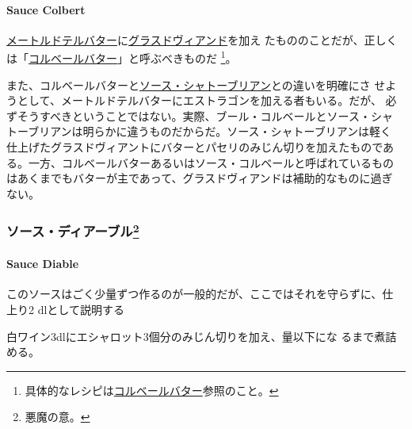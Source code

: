 \begin{recette}
\hypertarget{sauce-colbert}{%
\paragraph{Sauce Colbert}\label{sauce-colbert}}

  

\protect\hyperlink{}{メートルドテルバター}に\protect\hyperlink{glace-de-viande}{グラスドヴィアンド}を加え
たもののことだが、正しくは「\protect\hyperlink{}{コルベールバター}」と呼ぶべきものだ
\footnote{具体的なレシピは\protect\hyperlink{}{コルベールバター}参照のこと。}。

また、コルベールバターと\protect\hyperlink{sauce-chateaubriand}{ソース・シャトーブリアン}との違いを明確にさ
せようとして、メートルドテルバターにエストラゴンを加える者もいる。だが、
必ずそうすべきということではない。実際、ブール・コルベールとソース・シャ
トーブリアンは明らかに違うものだからだ。ソース・シャトーブリアンは軽く
仕上げたグラスドヴィアントにバターとパセリのみじん切りを加えたものであ
る。一方、コルベールバターあるいはソース・コルベールと呼ばれているもの
はあくまでもバターが主であって、グラスドヴィアンドは補助的なものに過ぎ
ない。

\maeaki

\hypertarget{ux30bdux30fcux30b9ux30c7ux30a3ux30a2ux30fcux30d6ux30eb25}{%
\subsubsection[ソース・ディアーブル]{\texorpdfstring{ソース・ディアーブル\footnote{悪魔の意。}}{ソース・ディアーブル}}\label{ux30bdux30fcux30b9ux30c7ux30a3ux30a2ux30fcux30d6ux30eb25}}

\hypertarget{sauce-diable}{%
\paragraph{Sauce Diable}\label{sauce-diable}}

   

このソースはごく少量ずつ作るのが一般的だが、ここではそれを守らずに、仕
上り2\undemi{} dlとして説明する

白ワイン3dlにエシャロット3個分のみじん切りを加え、\untiers{}量以下にな
るまで煮詰める。


\end{recette}
